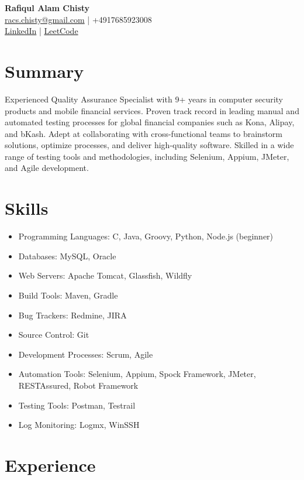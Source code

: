 \documentclass[a4paper,9pt]{article}
\begin{document}
\begin{center}
    \textbf{\Huge Rafiqul Alam Chisty} \\[0.5em]
    \href{mailto:racs.chisty@gmail.com}{racs.chisty@gmail.com} | +4917685923008 \\[0.5em]
    \href{https://linkedin.com/in/rafiqul-chisty}{LinkedIn} | \href{https://leetcode.com/u/racs/}{LeetCode}
\end{center}

\section*{Summary}
Experienced Quality Assurance Specialist with 9+ years in computer security products and mobile financial services. Proven track record in leading manual and automated testing processes for global financial companies such as Kona, Alipay, and bKash. Adept at collaborating with cross-functional teams to brainstorm solutions, optimize processes, and deliver high-quality software. Skilled in a wide range of testing tools and methodologies, including Selenium, Appium, JMeter, and Agile development.

\section*{Skills}
\begin{multicols}{2}
    \begin{itemize}
        \item Programming Languages: C, Java, Groovy, Python, Node.js (beginner)
        \item Databases: MySQL, Oracle
        \item Web Servers: Apache Tomcat, Glassfish, Wildfly
        \item Build Tools: Maven, Gradle
        \item Bug Trackers: Redmine, JIRA
        \item Source Control: Git
        \item Development Processes: Scrum, Agile
        \item Automation Tools: Selenium, Appium, Spock Framework, JMeter, RESTAssured, Robot Framework
        \item Testing Tools: Postman, Testrail
        \item Log Monitoring: Logmx, WinSSH
    \end{itemize}
\end{multicols}

\section*{Experience}
\end{document}
